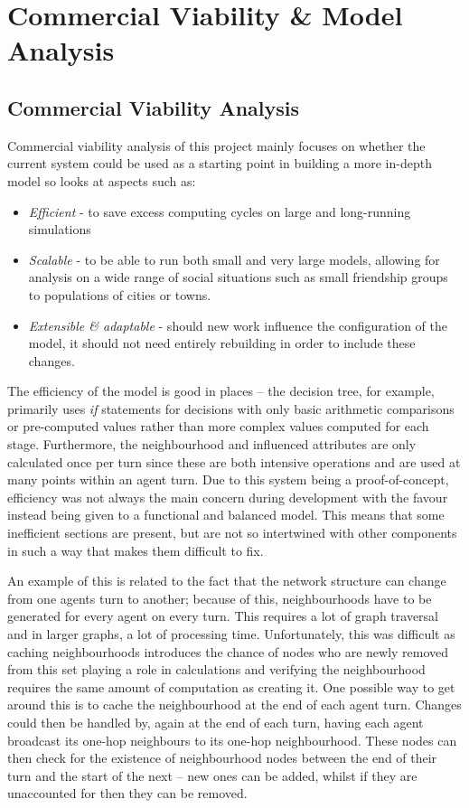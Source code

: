 \documentclass[]{report}
\begin{document}
\section{Commercial Viability \& Model Analysis}
\subsection{Commercial Viability Analysis}

Commercial viability analysis of this project mainly focuses on whether the current system could be used as a starting point in building a more in-depth model so looks at aspects such as:
\begin{itemize}
\item \emph{Efficient} - to save excess computing cycles on large and long-running simulations
\item \emph{Scalable} - to be able to run both small and very large models, allowing for analysis on a wide range of social situations such as small friendship groups to populations of cities or towns.
\item \emph{Extensible \& adaptable} - should new work influence the configuration of the model, it should not need entirely rebuilding in order to include these changes.
\end{itemize}

The efficiency of the model is good in places – the decision tree, for example, primarily uses \emph{if} statements for decisions with only basic arithmetic comparisons or pre-computed values rather than more complex values computed for each stage. Furthermore, the neighbourhood and influenced attributes are only calculated once per turn since these are both intensive operations and are used at many points within an agent turn.  Due to this system being a proof-of-concept, efficiency was not always the main concern during development with the favour instead being given to a functional and balanced model. This means that some inefficient sections are present, but are not so intertwined with other components in such a way that makes them difficult to fix.   

An example of this is related to the fact that the network structure can change from one agents turn to another; because of this, neighbourhoods have to be generated for every agent on every turn. This requires a lot of graph traversal and in larger graphs, a lot of processing time. Unfortunately, this was difficult as caching neighbourhoods introduces the chance of nodes who are newly removed from this set playing a role in calculations and verifying the neighbourhood requires the same amount of computation as creating it. One possible way to get around this is to cache the neighbourhood at the end of each agent turn. Changes could then be handled by, again at the end of each turn, having each agent broadcast its one-hop neighbours to its one-hop neighbourhood. These nodes can then check for the existence of neighbourhood nodes between the end of their turn and the start of the next – new ones can be added, whilst if they are unaccounted for then they can be removed.
\end{document}
